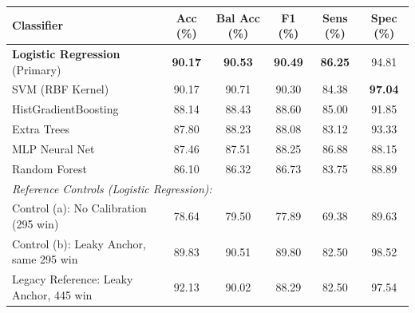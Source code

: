 \begin{tabular}{lccccc}
\toprule
\textbf{Classifier} & \textbf{Acc (\%)} & \textbf{Bal Acc (\%)} & \textbf{F1 (\%)} & \textbf{Sens (\%)} & \textbf{Spec (\%)} \\
\midrule
\textbf{Logistic Regression} (Primary) & \textbf{90.17} & \textbf{90.53} & \textbf{90.49} & \textbf{86.25} & 94.81 \\
SVM (RBF Kernel)               & 90.17 & 90.71 & 90.30 & 84.38 & \textbf{97.04} \\
HistGradientBoosting           & 88.14 & 88.43 & 88.60 & 85.00 & 91.85 \\
Extra Trees                    & 87.80 & 88.23 & 88.08 & 83.12 & 93.33 \\
MLP Neural Net                 & 87.46 & 87.51 & 88.25 & 86.88 & 88.15 \\
Random Forest                  & 86.10 & 86.32 & 86.73 & 83.75 & 88.89 \\
\midrule
\multicolumn{6}{l}{\textit{Reference Controls (Logistic Regression):}} \\
Control (a): No Calibration (295 win)       & 78.64 & 79.50 & 77.89 & 69.38 & 89.63 \\
Control (b): Leaky Anchor, same 295 win      & 89.83 & 90.51 & 89.80 & 82.50 & 98.52 \\
Legacy Reference: Leaky Anchor, 445 win     & 92.13 & 90.02 & 88.29 & 82.50 & 97.54 \\
\bottomrule
\end{tabular}

